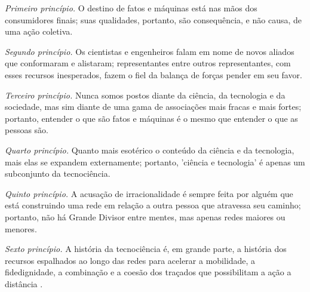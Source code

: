 \begin{citacaoabnt}
\textit{Primeiro princípio.} O destino de fatos e máquinas está nas mãos dos consumidores finais; suas qualidades, portanto, são consequência, e não causa, de uma ação coletiva.

\textit{Segundo princípio.} Os cientistas e engenheiros falam em nome de novos aliados que conformaram e alistaram; representantes entre outros representantes, com esses recursos inesperados, fazem o fiel da balança de forças pender em seu favor.

\textit{Terceiro princípio.} Nunca somos postos diante da ciência, da tecnologia e da sociedade, mas sim diante de uma gama de associações mais fracas e mais fortes; portanto, entender o que são fatos e máquinas é o mesmo que entender o que as pessoas são.

\textit{Quarto princípio.} Quanto mais esotérico o conteúdo da ciência e da tecnologia, mais elas se expandem externamente; portanto, 'ciência e tecnologia' é apenas um subconjunto da tecnociência.

\textit{Quinto princípio.} A acusação de irracionalidade é sempre feita por alguém que está construindo uma rede em relação a outra pessoa que atravessa seu caminho; portanto, não há Grande Divisor entre mentes, mas apenas redes maiores ou menores.

\textit{Sexto princípio.} A história da tecnociência é, em grande parte, a história dos recursos espalhados ao longo das redes para acelerar a mobilidade, a fidedignidade, a combinação e a coesão dos traçados que possibilitam a ação a distância \parencite[p. 422-424]{Latour2011CienciaEmAcao}.
\end{citacaoabnt}

